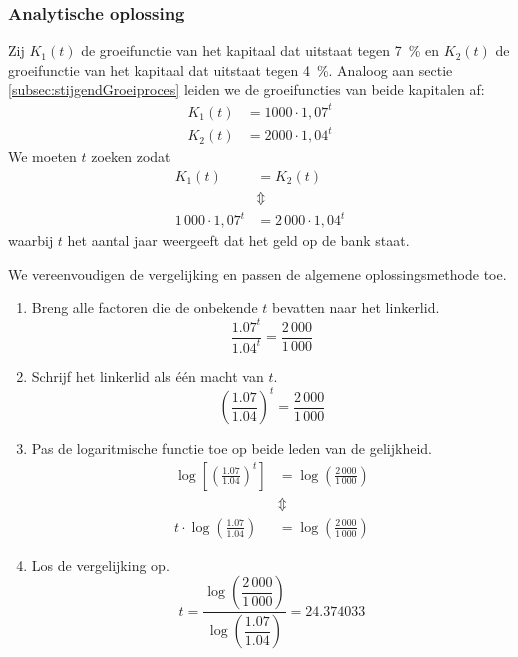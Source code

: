 \subsubsection{Analytische oplossing}
Zij $K_1(t)$ de groeifunctie van het kapitaal dat uitstaat tegen \SI{7}{\percent} en $K_2(t)$ de groeifunctie van het kapitaal dat uitstaat tegen \SI{4}{\percent}. Analoog aan sectie \ref{subsec:stijgendGroeiproces} leiden we de groeifuncties van beide kapitalen af:
\begin{equation}
\begin{split}
K_1(t)&=1000\cdot 1,07^t\\
K_2(t)&=2000\cdot 1,04^t
\end{split}
\end{equation}
We moeten $t$ zoeken zodat 
\begin{equation}
\begin{split}
K_1(t)&=K_2(t)   \\
&\Updownarrow\\
1\,000\cdot 1,07^t&=2\,000\cdot 1,04^t
\end{split}
\label{exp_vgl:vb2}
\end{equation} 
waarbij $t$ het aantal jaar weergeeft dat het geld op de bank staat.

We vereenvoudigen de vergelijking en passen de algemene
oplossingsmethode toe. 

\begin{enumerate}
\item Breng alle factoren die de onbekende $t$ bevatten naar het linkerlid.
\[
    \frac{\num{1.07}^t}{\num{1.04}^{t}}=\frac{2\,000}{1\,000}
\]
\item Schrijf het linkerlid als \'e\'en macht van $t$.
\[
\left(\frac{\num{1.07}}{\num{1.04}}\right)^{t}=\frac{2\,000}{1\,000}
\]
\item Pas de logaritmische functie toe op beide leden van de gelijkheid.
\begin{align*}
\log\left[\left(\frac{\num{1.07}}{\num{1.04}}\right)^{t}\right]&= \log\left(\frac{2\,000}{1\,000}\right)\\
     &\Updownarrow  \\
t\cdot \log\left(\frac{\num{1.07}}{\num{1.04}}\right)&= \log\left(\frac{2\,000}{1\,000}\right)
\end{align*}
\item Los de vergelijking op.
\[
t=\frac{\log\left(\dfrac{2\,000}{1\,000}\right)}{\log\left(\dfrac{\num{1.07}}{\num{1.04}}\right)}=\num{24.374033}
\]
\end{enumerate}

